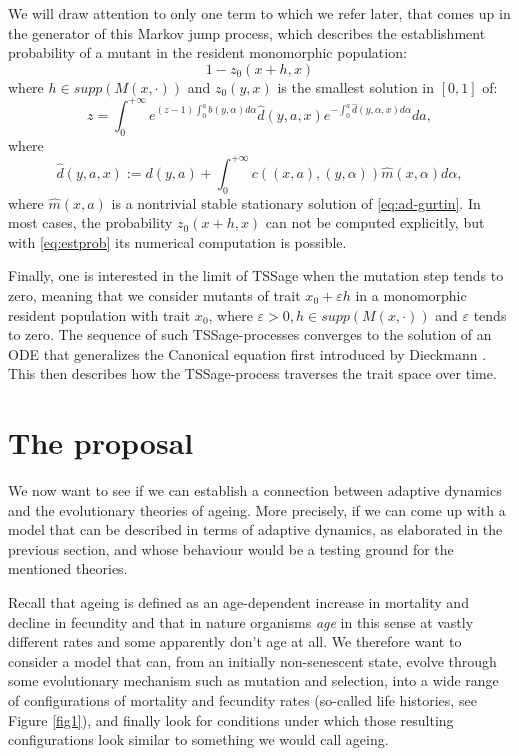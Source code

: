 \documentclass[11pt, a4paper]{article}
\theoremstyle{definition}
\begin{document}
     We will draw attention to only one term to which we refer later, that comes up in the generator of this Markov jump process, which describes the establishment probability of a mutant in the resident monomorphic population:
    \begin{equation}
        1-z_0(x+h,x)
    \end{equation}
    where $h \in supp(M(x,\cdot))$ and $z_0(y,x)$ is the smallest solution in $[0,1]$ of:
    \begin{equation}\label{eq:estprob}
        z = \int_0^{+\infty} e^{(z-1) \int_0^a b(y,\alpha)d\alpha} \hat{d}(y,a,x) e^{-\int_0^a \hat{d}(y,\alpha,x)d\alpha} da,
    \end{equation}
    where 
    \begin{equation}
    \hat{d}(y,a,x) := d(y,a) + \int_0^{+\infty} c((x,a),(y,\alpha))\hat{m}(x,\alpha)d\alpha,
    \end{equation}
    where $\hat{m}(x,a)$ is a nontrivial stable stationary solution of \eqref{eq:ad-gurtin}.
    In most cases, the probability $z_0(x+h,x)$ can not be computed explicitly, but with \eqref{eq:estprob} its numerical computation is possible.

    Finally, one is interested in the limit of TSSage when the mutation step tends to zero, meaning that we consider mutants of trait $x_0 + \varepsilon h$ in a monomorphic resident population with trait $x_0$, where $\varepsilon>0, h\in supp(M(x,\cdot))$ and $\varepsilon$ tends to zero. The sequence of such TSSage-processes converges to the solution of an ODE that generalizes the Canonical equation first introduced by Dieckmann \autocite{dieckmann1996}. This then describes how the TSSage-process traverses the trait space over time.
    
\section{The proposal}
    We now want to see if we can establish a connection between adaptive dynamics and the evolutionary theories of ageing. More precisely, if we can come up with a model that can be described in terms of adaptive dynamics, as elaborated in the previous section, and whose behaviour would be a testing ground for the mentioned theories.

    Recall that ageing is defined as an age-dependent increase in mortality and decline in fecundity and that in nature organisms \emph{age} in this sense at vastly different rates and some apparently don't age at all. We therefore want to consider a model that can, from an initially non-senescent state, evolve through some evolutionary mechanism such as mutation and selection, into a wide range of configurations of mortality and fecundity rates (so-called life histories, see Figure \ref{fig1}), and finally look for conditions under which those resulting configurations look similar to something we would call ageing.
\end{document}
